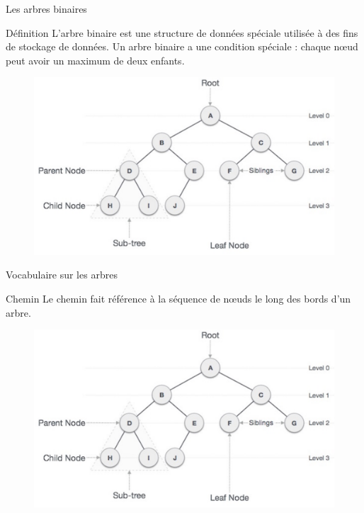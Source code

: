\documentclass[10pt,xcolor=dvipsnames]{beamer}
\newcommand{\defin}[1]{\textcolor{darkspringgreen}{#1}}
\begin{document}
\begin{frame}{Les arbres binaires}
    \begin{exampleblock}{Définition}
    \defin{L'arbre binaire} est une structure de données spéciale utilisée à des fins de stockage de données. Un arbre binaire a une condition spéciale : chaque nœud peut avoir un maximum de deux enfants.
    \end{exampleblock}
    \begin{figure}
    \centering
    \includegraphics[scale=0.2]{figures/CM2/ABR-1.png}
    \label{fig:my_label}
\end{figure}
    
\end{frame}

\begin{frame}{Vocabulaire sur les arbres}
    \begin{exampleblock}{Chemin}
    Le \defin{chemin} fait référence à la séquence de nœuds le long des bords d'un arbre.
    \end{exampleblock}
    
    \begin{figure}
    \centering
    \includegraphics[scale=0.2]{figures/CM2/ABR-1.png}
    \label{fig:my_label}
\end{figure}
\end{frame}
\end{document}
